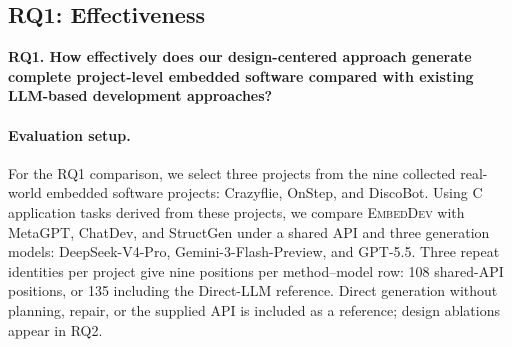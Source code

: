 \subsection{RQ1: Effectiveness}
\label{sec:rq1-effectiveness}
\textbf{RQ1. How effectively does our design-centered approach generate complete project-level embedded software compared with existing LLM-based development approaches?}

\paragraph{Evaluation setup.}
For the RQ1 comparison, we select three projects from the nine collected real-world embedded software projects: Crazyflie, OnStep, and DiscoBot. Using C application tasks derived from these projects, we compare \textsc{EmbedDev} with MetaGPT, ChatDev, and StructGen under a shared API and three generation models: DeepSeek-V4-Pro, Gemini-3-Flash-Preview, and GPT-5.5. Three repeat identities per project give nine positions per method--model row: 108 shared-API positions, or 135 including the Direct-LLM reference. Direct generation without planning, repair, or the supplied API is included as a reference; design ablations appear in RQ2.

